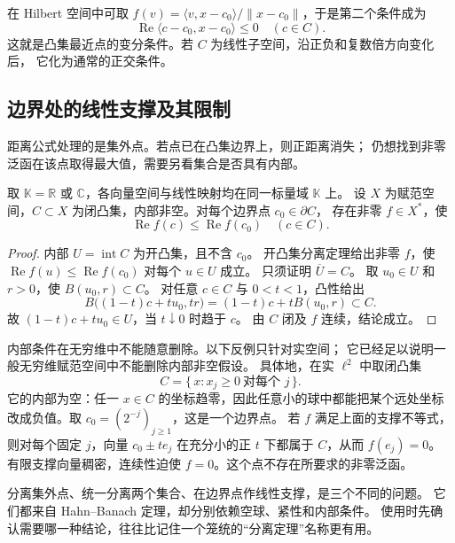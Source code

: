 在 Hilbert 空间中可取
\(f(v)=\langle v,x-c_0\rangle/\|x-c_0\|\)，于是第二个条件成为
\[
 \operatorname{Re}\langle c-c_0,x-c_0\rangle\leq0\quad(c\in C).
\]
这就是凸集最近点的变分条件。若 \(C\) 为线性子空间，沿正负和复数倍方向变化后，
它化为通常的正交条件。

\subsection{边界处的线性支撑及其限制}
\label{b1:subsec:C10603}

距离公式处理的是集外点。若点已在凸集边界上，则正距离消失；
仍想找到非零泛函在该点取得最大值，需要另看集合是否具有内部。

\begin{proposition}\label{b1:prop:C1-boundary-support}
取 \(\mathbb K=\mathbb R\) 或 \(\mathbb C\)，各向量空间与线性映射均在同一标量域 \(\mathbb K\) 上。
设 \(X\) 为赋范空间，\(C\subset X\) 为闭凸集，内部非空。对每个边界点 \(c_0\in\partial C\)，
存在非零 \(f\in X^*\)，使
\[
 \operatorname{Re}f(c)\leq\operatorname{Re}f(c_0)\quad(c\in C).
\]
\end{proposition}
\begin{proof}
内部 \(U=\operatorname{int}C\) 为开凸集，且不含 \(c_0\)。
开凸集分离定理给出非零 \(f\)，使
\(\operatorname{Re}f(u)\leq\operatorname{Re}f(c_0)\) 对每个 \(u\in U\) 成立。
只须证明 \(\overline U=C\)。
取 \(u_0\in U\) 和 \(r>0\)，使 \(B(u_0,r)\subset C\)。
对任意 \(c\in C\) 与 \(0<t<1\)，凸性给出
\[
 B\bigl((1-t)c+tu_0,tr\bigr)
 =(1-t)c+tB(u_0,r)\subset C.
\]
故 \((1-t)c+tu_0\in U\)，当 \(t\downarrow0\) 时趋于 \(c\)。
由 \(C\) 闭及 \(f\) 连续，结论成立。
\end{proof}

内部条件在无穷维中不能随意删除。以下反例只针对实空间；
它已经足以说明一般无穷维赋范空间中不能删除内部非空假设。
具体地，在实 \(\ell^2\) 中取闭凸集
\[
 C=\{\,x:x_j\geq0\ \text{对每个 }j\,\}.
\]
它的内部为空：任一 \(x\in C\) 的坐标趋零，因此任意小的球中都能把某个远处坐标
改成负值。取 \(c_0=(2^{-j})_{j\geq1}\)，这是一个边界点。
若 \(f\) 满足上面的支撑不等式，则对每个固定 \(j\)，向量
\(c_0\pm te_j\) 在充分小的正 \(t\) 下都属于 \(C\)，从而 \(f(e_j)=0\)。
有限支撑向量稠密，连续性迫使 \(f=0\)。这个点不存在所要求的非零泛函。

\ProseParagraphBreak

分离集外点、统一分离两个集合、在边界点作线性支撑，是三个不同的问题。
它们都来自 Hahn--Banach 定理，却分别依赖空球、紧性和内部条件。
使用时先确认需要哪一种结论，往往比记住一个笼统的“分离定理”名称更有用。
